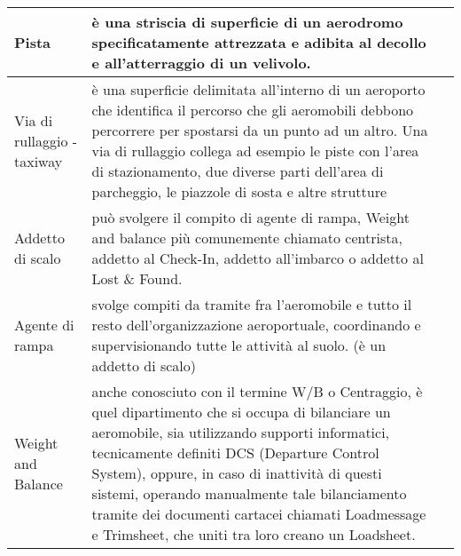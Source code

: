 \begin{landscape}
\begin{table}[htp]
{\begin{tabular}{p{}|p{}|p{}}
		\hline
		\textsf{\small Pista} & \textsf{\small è una striscia di superficie di un aerodromo specificatamente attrezzata e adibita al decollo e all'atterraggio di un velivolo.} & \textsf{\small } \\
		\hline
		\textsf{\small Via di rullaggio - taxiway} & \textsf{\small è una superficie delimitata all'interno di un aeroporto che identifica il percorso che gli aeromobili debbono percorrere per spostarsi da un punto ad un altro. Una via di rullaggio collega ad esempio le piste con l'area di stazionamento, due diverse parti dell'area di parcheggio, le piazzole di sosta e altre strutture} & \textsf{\small } \\
		\hline
		\textsf{\small Addetto di scalo} & \textsf{\small può svolgere il compito di agente di rampa, Weight and balance più comunemente chiamato centrista, addetto al Check-In, addetto all'imbarco o addetto al Lost \& Found.} & \textsf{\small } \\
		\hline
		\textsf{\small Agente di rampa} & \textsf{\small  svolge compiti da tramite fra l'aeromobile e tutto il resto dell'organizzazione aeroportuale, coordinando e supervisionando tutte le attività al suolo. (è un addetto di scalo)} & \textsf{\small } \\
		\hline
		\textsf{\small Weight and Balance} & \textsf{\small  anche conosciuto con il termine W/B o Centraggio, è quel dipartimento che si occupa di bilanciare un aeromobile, sia utilizzando supporti informatici, tecnicamente definiti DCS (Departure Control System), oppure, in caso di inattività di questi sistemi, operando manualmente tale bilanciamento tramite dei documenti cartacei chiamati Loadmessage e Trimsheet, che uniti tra loro creano un Loadsheet.} & \textsf{\small } \\
		\hline
		\end{tabular}%
	}%
\end{table}
\end{landscape}

\newpage

